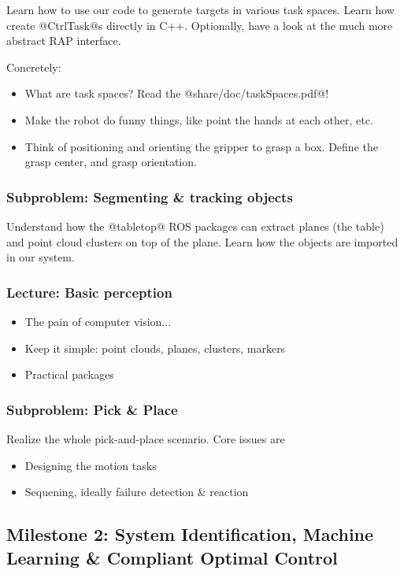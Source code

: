\documentclass[10pt,fleqn,twoside]{article}
\begin{document}
Learn how to use our code to generate targets in various task
spaces. Learn how create @CtrlTask@s directly in C++. Optionally, have
a look at the much more abstract RAP interface.

Concretely:
\begin{itemize}
\item What are task spaces? Read the @share/doc/taskSpaces.pdf@!
\item Make the robot do funny things, like point the hands at each
  other, etc.
\item Think of positioning and orienting the gripper to grasp a
  box. Define the grasp center, and grasp orientation.
\end{itemize}




\subsubsection{Subproblem: Segmenting \& tracking objects}

Understand how the @tabletop@ ROS packages can extract planes (the
table) and point cloud clusters on top of the plane. Learn how the
objects are imported in our system.

\subsubsection{Lecture: Basic perception}
\begin{itemize}
\item The pain of computer vision...
\item Keep it simple: point clouds, planes, clusters, markers
\item Practical packages
\end{itemize}

\subsubsection{Subproblem: Pick \& Place}

Realize the whole pick-and-place scenario. Core issues are
\begin{itemize}
\item Designing the motion tasks
\item Sequening, ideally failure detection \& reaction
\end{itemize}




\subsection{Milestone 2: System Identification, Machine Learning \&
  Compliant Optimal Control}
\end{document}
